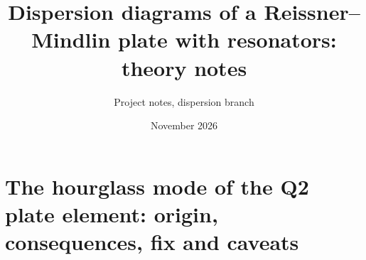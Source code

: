 \documentclass[11pt]{report}
\title{Dispersion diagrams of a Reissner--Mindlin plate with resonators:\\ theory notes}
\author{Project notes, dispersion branch}
\date{November 2026}
\begin{document}
\maketitle
\tableofcontents











\appendix
\chapter{The hourglass mode of the Q2 plate element: origin, consequences, fix and caveats}
\label{app:hourglass}

\end{document}
